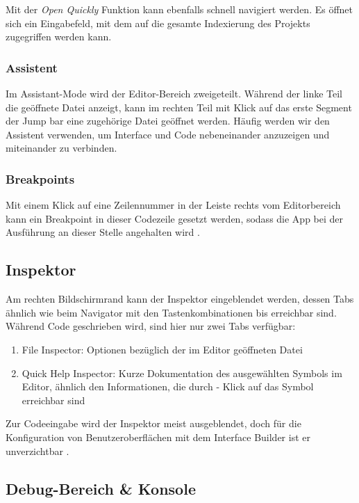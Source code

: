 \documentclass[parskip=half, final]{scrreprt}
\begin{document}
Mit der \emph{Open Quickly} Funktion  kann ebenfalls schnell navigiert werden. Es öffnet sich ein Eingabefeld, mit dem auf die gesamte Indexierung des Projekts zugegriffen werden kann.

\subsubsection{Assistent}

Im Assistant-Mode wird der Editor-Bereich zweigeteilt. Während der linke Teil die geöffnete Datei anzeigt, kann im rechten Teil mit Klick auf das erste Segment der Jump bar eine zugehörige Datei geöffnet werden. Häufig werden wir den Assistent verwenden, um Interface und Code nebeneinander anzuzeigen und miteinander zu verbinden.

\subsubsection{Breakpoints}\label{sec:breakpoints}

Mit einem Klick auf eine Zeilennummer in der Leiste rechts vom Editorbereich kann ein Breakpoint in dieser Codezeile gesetzt werden, sodass die App bei der Ausführung an dieser Stelle angehalten wird .

\subsection{Inspektor}\label{sec:inspektor}

Am rechten Bildschirmrand kann der Inspektor eingeblendet werden, dessen Tabs ähnlich wie beim Navigator mit den Tastenkombinationen  bis  erreichbar sind. Während Code geschrieben wird, sind hier nur zwei Tabs verfügbar:
\begin{enumerate}
\item File Inspector: Optionen bezüglich der im Editor geöffneten Datei
\item Quick Help Inspector: Kurze Dokumentation des ausgewählten Symbols im Editor, ähnlich den Informationen, die durch \keys{\Alt} - Klick auf das Symbol erreichbar sind
\end{enumerate}
Zur Codeeingabe wird der Inspektor meist ausgeblendet, doch für die Konfiguration von Benutzeroberflächen mit dem Interface Builder ist er unverzichtbar .

\subsection{Debug-Bereich \& Konsole}\label{sec:debugarea}
\end{document}
